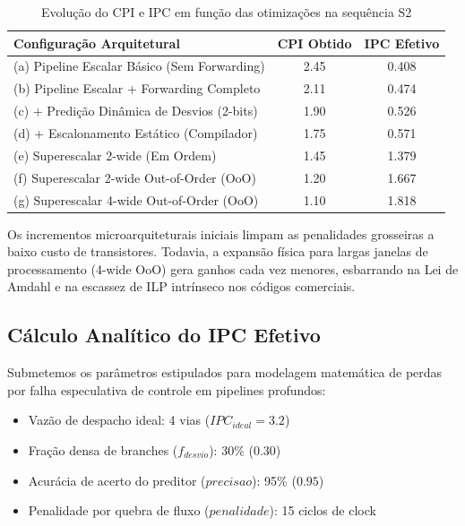 \documentclass[12pt,a4paper]{article}
\begin{document}
\begin{table}[H]
\centering
\caption{Evolução do CPI e IPC em função das otimizações na sequência S2}
\label{tab:evolucao_s2}
\begin{tabular}{@{}lcc@{}}
\toprule
\textbf{Configuração Arquitetural} & \textbf{CPI Obtido} & \textbf{IPC Efetivo} \\ \midrule
(a) Pipeline Escalar Básico (Sem Forwarding) & 2.45 & 0.408 \\
(b) Pipeline Escalar + Forwarding Completo   & 2.11 & 0.474 \\
(c) + Predição Dinâmica de Desvios (2-bits)  & 1.90 & 0.526 \\
(d) + Escalonamento Estático (Compilador)    & 1.75 & 0.571 \\
(e) Superescalar 2-wide (Em Ordem)           & 1.45 & 1.379 \\
(f) Superescalar 2-wide Out-of-Order (OoO)   & 1.20 & 1.667 \\
(g) Superescalar 4-wide Out-of-Order (OoO)   & 1.10 & 1.818 \\ \bottomrule
\end{tabular}
\end{table}

Os incrementos microarquiteturais iniciais limpam as penalidades grosseiras a baixo custo de transistores. Todavia, a expansão física para largas janelas de processamento (4-wide OoO) gera ganhos cada vez menores, esbarrando na Lei de Amdahl e na escassez de ILP intrínseco nos códigos comerciais.

\subsection{Cálculo Analítico do IPC Efetivo}
Submetemos os parâmetros estipulados para modelagem matemática de perdas por falha especulativa de controle em pipelines profundos:
\begin{itemize}
    \item Vazão de despacho ideal: 4 vias ($IPC_{ideal} = 3.2$)
    \item Fração densa de branches ($f_{desvio}$): 30\% ($0.30$)
    \item Acurácia de acerto do preditor ($precisao$): 95\% ($0.95$)
    \item Penalidade por quebra de fluxo ($penalidade$): 15 ciclos de clock
\end{itemize}
\end{document}
